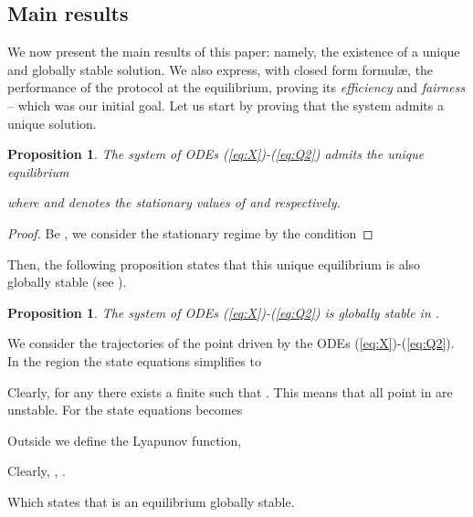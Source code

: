 \documentclass[conference]{IEEEtran}
\newtheorem{prop}[theorem]{Proposition}
\begin{document}
\subsection{Main results}
We now present the main results of this paper: namely, the existence of a unique and globally stable solution. 
We also express, with closed form formul\ae, the performance of the protocol at the equilibrium, proving its 
\emph{efficiency} and \emph{fairness} -- which was our initial goal. Let us start by proving that the system admits 
a unique solution.
\begin{prop}\label{prop:one-flow1}
The system of ODEs (\ref{eq:X})-(\ref{eq:Q2}) admits the unique
equilibrium 

where  and  denotes the stationary values of  and  respectively.
\end{prop}
\vspace{-1mm}
\begin{proof}
Be , we consider the stationary regime by the condition


\end{proof}
\noindent Then, the following proposition states that this unique equilibrium
is also globally stable (see \cite{Verhulst}).
\begin{prop}\label{prop:one-flow2}
The system of ODEs (\ref{eq:X})-(\ref{eq:Q2}) is globally stable in .
\end{prop}

\begin{IEEEproof}
We consider the trajectories of the point  driven
by the ODEs (\ref{eq:X})-(\ref{eq:Q2}).
In the region  the state equations simplifies to

Clearly, for any   there exists a finite  such that
. This means that all point in  are unstable.  
For   the state equations becomes

Outside  we define the Lyapunov function, 
 
Clearly, ,  .
 
Which states that  is an equilibrium globally stable.
\end{IEEEproof}
\end{document}
